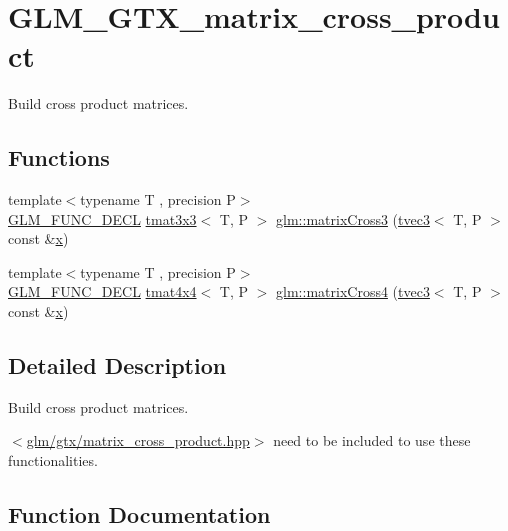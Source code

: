 \hypertarget{group__gtx__matrix__cross__product}{}\section{G\+L\+M\+\_\+\+G\+T\+X\+\_\+matrix\+\_\+cross\+\_\+product}
\label{group__gtx__matrix__cross__product}


Build cross product matrices.  


\subsection*{Functions}
\begin{DoxyCompactItemize}
\item 
{\footnotesize template$<$typename T , precision P$>$ }\\\mbox{\hyperlink{setup_8hpp_ab2d052de21a70539923e9bcbf6e83a51}{G\+L\+M\+\_\+\+F\+U\+N\+C\+\_\+\+D\+E\+CL}} \mbox{\hyperlink{structglm_1_1tmat3x3}{tmat3x3}}$<$ T, P $>$ \mbox{\hyperlink{group__gtx__matrix__cross__product_ga04385b2e3a93c78d116b51af2d8d708e}{glm\+::matrix\+Cross3}} (\mbox{\hyperlink{structglm_1_1tvec3}{tvec3}}$<$ T, P $>$ const \&\mbox{\hyperlink{glad_8h_a92d0386e5c19fb81ea88c9f99644ab1d}{x}})
\item 
{\footnotesize template$<$typename T , precision P$>$ }\\\mbox{\hyperlink{setup_8hpp_ab2d052de21a70539923e9bcbf6e83a51}{G\+L\+M\+\_\+\+F\+U\+N\+C\+\_\+\+D\+E\+CL}} \mbox{\hyperlink{structglm_1_1tmat4x4}{tmat4x4}}$<$ T, P $>$ \mbox{\hyperlink{group__gtx__matrix__cross__product_ga2d46cc5253761c214aa5c782865156b1}{glm\+::matrix\+Cross4}} (\mbox{\hyperlink{structglm_1_1tvec3}{tvec3}}$<$ T, P $>$ const \&\mbox{\hyperlink{glad_8h_a92d0386e5c19fb81ea88c9f99644ab1d}{x}})
\end{DoxyCompactItemize}


\subsection{Detailed Description}
Build cross product matrices. 

$<$\mbox{\hyperlink{matrix__cross__product_8hpp}{glm/gtx/matrix\+\_\+cross\+\_\+product.\+hpp}}$>$ need to be included to use these functionalities. 

\subsection{Function Documentation}
\mbox{\label{group__gtx__matrix__cross__product_ga04385b2e3a93c78d116b51af2d8d708e}} 
